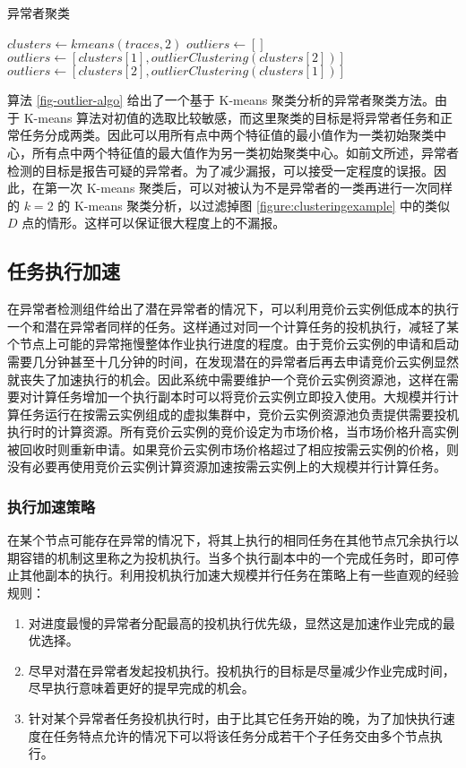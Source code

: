 \begin{algorithm}
\caption{异常者聚类}
\label{fig-outlier-algo}
%
$clusters\gets kmeans(traces, 2)$
$outliers\gets []$\;
{
  {
    $outliers\gets [clusters[1], outlierClustering(clusters[2])]$\;
  }
  {
    $outliers\gets [clusters[2], outlierClustering(clusters[1])]$\;
  }
}
\;
\end{algorithm}

算法 \ref{fig-outlier-algo} 给出了一个基于 K-means 聚类分析的异常者聚类方法。由于 K-means 算法对初值的选取比较敏感，而这里聚类的目标是将异常者任务和正常任务分成两类。因此可以用所有点中两个特征值的最小值作为一类初始聚类中心，所有点中两个特征值的最大值作为另一类初始聚类中心。如前文所述，异常者检测的目标是报告可疑的异常者。为了减少漏报，可以接受一定程度的误报。因此，在第一次 K-means 聚类后，可以对被认为不是异常者的一类再进行一次同样的 $k = 2$ 的 K-means 聚类分析，以过滤掉图 \ref{figure:clusteringexample} 中的类似 $D$ 点的情形。这样可以保证很大程度上的不漏报。

\subsection{任务执行加速}
在异常者检测组件给出了潜在异常者的情况下，可以利用竞价云实例低成本的执行一个和潜在异常者同样的任务。这样通过对同一个计算任务的投机执行，减轻了某个节点上可能的异常拖慢整体作业执行进度的程度。由于竞价云实例的申请和启动需要几分钟甚至十几分钟的时间，在发现潜在的异常者后再去申请竞价云实例显然就丧失了加速执行的机会。因此系统中需要维护一个竞价云实例资源池，这样在需要对计算任务增加一个执行副本时可以将竞价云实例立即投入使用。大规模并行计算任务运行在按需云实例组成的虚拟集群中，竞价云实例资源池负责提供需要投机执行时的计算资源。所有竞价云实例的竞价设定为市场价格，当市场价格升高实例被回收时则重新申请。如果竞价云实例市场价格超过了相应按需云实例的价格，则没有必要再使用竞价云实例计算资源加速按需云实例上的大规模并行计算任务。

\subsubsection{执行加速策略}
在某个节点可能存在异常的情况下，将其上执行的相同任务在其他节点冗余执行以期容错的机制这里称之为投机执行。当多个执行副本中的一个完成任务时，即可停止其他副本的执行。利用投机执行加速大规模并行任务在策略上有一些直观的经验规则：
\begin{enumerate}
\item 对进度最慢的异常者分配最高的投机执行优先级，显然这是加速作业完成的最优选择。
\item 尽早对潜在异常者发起投机执行。投机执行的目标是尽量减少作业完成时间，尽早执行意味着更好的提早完成的机会。
\item 针对某个异常者任务投机执行时，由于比其它任务开始的晚，为了加快执行速度在任务特点允许的情况下可以将该任务分成若干个子任务交由多个节点执行。
\end{enumerate}

